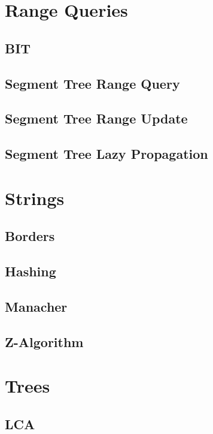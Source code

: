 \section{Range Queries}
\subsection{BIT}
\raggedbottom
\hrulefill
\subsection{   Segment Tree Range Query}
\raggedbottom
\hrulefill
\subsection{  Segment Tree Range Update}
\raggedbottom
\hrulefill
\subsection{Segment Tree Lazy Propagation}
\raggedbottom
\hrulefill

\section{Strings}
\subsection{Borders}
\raggedbottom
\hrulefill
\subsection{Hashing}
\raggedbottom
\hrulefill
\subsection{   Manacher}
\raggedbottom
\hrulefill
\subsection{Z-Algorithm}
\raggedbottom
\hrulefill

\section{Trees}
\subsection{LCA}
\raggedbottom
\hrulefill

